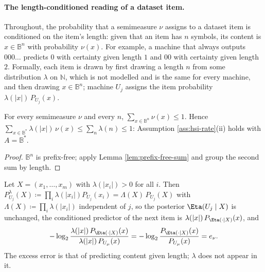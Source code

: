 \paragraph{The length-conditioned reading of a dataset item.}
Throughout, the probability that a semimeasure $\nu$ assigns to a dataset item is conditioned on the item's length: given that an item has $n$ symbols, its content is $x\in\mathbb{B}^n$ with probability $\nu(x)$. For example, a machine that always outputs $000\dots$ predicts $0$ with certainty given length $1$ and $00$ with certainty given length $2$. Formally, each item is drawn by first drawing a length $n$ from some distribution $\lambda$ on $\mathbb{N}$, which is not modelled and is the same for every machine, and then drawing $x\in\mathbb{B}^n$; machine $U_j$ assigns the item probability $\lambda(|x|)\,P_{U_j}(x)$.

\begin{lemma}
\label{lem:length-sum}
For every semimeasure $\nu$ and every $n$, $\sum_{x\in\mathbb{B}^n}\nu(x)\le 1$. Hence $\sum_{x\in\mathbb{B}^*}\lambda(|x|)\,\nu(x)\le\sum_n\lambda(n)\le 1$: Assumption \ref{ass:hsi-rate}(ii) holds with $A=\mathbb{B}^*$.
\end{lemma}
\begin{proof}
$\mathbb{B}^n$ is prefix-free; apply Lemma \ref{lem:prefix-free-sum} and group the second sum by length.
\end{proof}

\begin{lemma}
\label{lem:lambda-cancels}
Let $X=(x_1,\dots,x_m)$ with $\lambda(|x_i|)>0$ for all $i$. Then $P_{U_j}^\lambda(X)\coloneq\prod_i\lambda(|x_i|)P_{U_j}(x_i)=\Lambda(X)\,P_{U_j}(X)$ with $\Lambda(X)\coloneq\prod_i\lambda(|x_i|)$ independent of $j$, so the posterior $\Eta(U_j\mid X)$ is unchanged, the conditioned predictor of the next item is $\lambda(|x|)\,P_{\Eta(\cdot\mid X)}(x)$, and
\[
    -\log_2\frac{\lambda(|x|)\,P_{\Eta(\cdot\mid X)}(x)}{\lambda(|x|)\,P_{U_\mu}(x)}
    = -\log_2\frac{P_{\Eta(\cdot\mid X)}(x)}{P_{U_\mu}(x)} = e_\nu .
\]
The excess error is that of predicting content given length; $\lambda$ does not appear in it.
\end{lemma}

